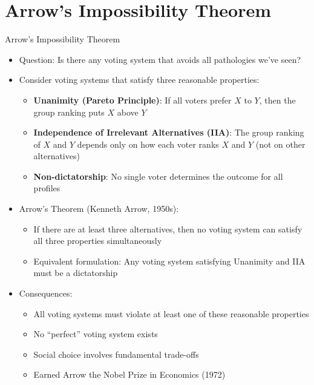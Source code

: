 \documentclass[10pt,handout]{beamer}
\begin{document}
\section{Arrow's Impossibility Theorem}

\begin{frame}{Arrow's Impossibility Theorem}
  \begin{itemize}[<+->]
    \item Question: Is there any voting system that avoids all pathologies we've seen?
    \item Consider voting systems that satisfy three reasonable properties:
      \begin{itemize}
        \item \textbf{Unanimity (Pareto Principle)}: If all voters prefer $X$ to $Y$, then the group ranking puts $X$ above $Y$
        \item \textbf{Independence of Irrelevant Alternatives (IIA)}: The group ranking of $X$ and $Y$ depends only on how each voter ranks $X$ and $Y$ (not on other alternatives)
        \item \textbf{Non-dictatorship}: No single voter determines the outcome for all profiles
      \end{itemize}
    \item Arrow's Theorem (Kenneth Arrow, 1950s): 
      \begin{itemize}
        \item If there are at least three alternatives, then no voting system can satisfy all three properties simultaneously
        \item Equivalent formulation: Any voting system satisfying Unanimity and IIA must be a dictatorship
      \end{itemize}
    \item Consequences:
      \begin{itemize}
        \item All voting systems must violate at least one of these reasonable properties
        \item No ``perfect'' voting system exists
        \item Social choice involves fundamental trade-offs
        \item Earned Arrow the Nobel Prize in Economics (1972)
      \end{itemize}
  \end{itemize}
\end{frame}
\end{document}
